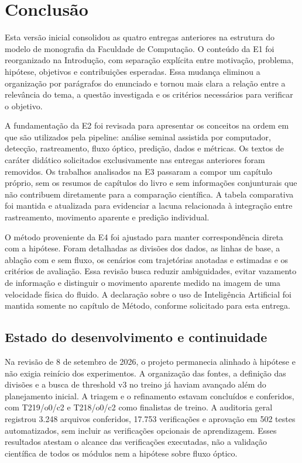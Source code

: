 \chapter[Conclusão]{Conclusão}

Esta versão inicial consolidou as quatro entregas anteriores na estrutura do modelo de monografia da Faculdade de Computação. O conteúdo da E1 foi reorganizado na Introdução, com separação explícita entre motivação, problema, hipótese, objetivos e contribuições esperadas. Essa mudança eliminou a organização por parágrafos do enunciado e tornou mais clara a relação entre a relevância do tema, a questão investigada e os critérios necessários para verificar o objetivo.

A fundamentação da E2 foi revisada para apresentar os conceitos na ordem em que são utilizados pela pipeline: análise seminal assistida por computador, detecção, rastreamento, fluxo óptico, predição, dados e métricas. Os textos de caráter didático solicitados exclusivamente nas entregas anteriores foram removidos. Os trabalhos analisados na E3 passaram a compor um capítulo próprio, sem os resumos de capítulos do livro e sem informações conjunturais que não contribuem diretamente para a comparação científica. A tabela comparativa foi mantida e atualizada para evidenciar a lacuna relacionada à integração entre rastreamento, movimento aparente e predição individual.

O método proveniente da E4 foi ajustado para manter correspondência direta com a hipótese. Foram detalhadas as divisões dos dados, as linhas de base, a ablação com e sem fluxo, os cenários com trajetórias anotadas e estimadas e os critérios de avaliação. Essa revisão busca reduzir ambiguidades, evitar vazamento de informação e distinguir o movimento aparente medido na imagem de uma velocidade física do fluido. A declaração sobre o uso de Inteligência Artificial foi mantida somente no capítulo de Método, conforme solicitado para esta entrega.

\section{Estado do desenvolvimento e continuidade}

Na revisão de 8 de setembro de 2026, o projeto permanecia alinhado à hipótese e não exigia reinício dos experimentos. A organização das fontes, a definição das divisões e a busca de threshold v3 no treino já haviam avançado além do planejamento inicial. A triagem e o refinamento estavam concluídos e conferidos, com T219/o0/c2 e T218/o0/c2 como finalistas de treino. A auditoria geral registrou 3.248 arquivos conferidos, 17.753 verificações e aprovação em 502 testes automatizados, sem incluir as verificações opcionais de aprendizagem. Esses resultados atestam o alcance das verificações executadas, não a validação científica de todos os módulos nem a hipótese sobre fluxo óptico.

